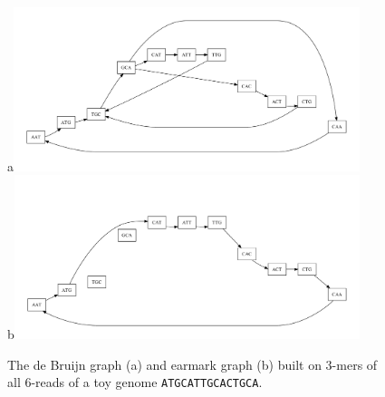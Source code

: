 \documentclass[12pt]{article}
\begin{document}
\begin{figure}
\caption{The de Bruijn graph (a) and earmark graph (b) built on $3$-mers 
of all $6$-reads of a toy genome {\tt ATGCATTGCACTGCA}.}\label{fig:debruijn}
\begin{center}
a\includegraphics[width=0.9\textwidth]{ATGCATTGCACTGCA_debruijn.pdf}\\
b\includegraphics[width=0.9\textwidth]{ATGCATTGCACTGCA_earmark.pdf}\\
\end{center}
\end{figure}
\end{document}
